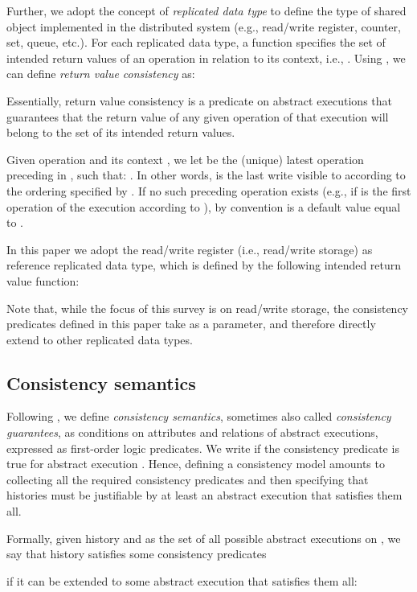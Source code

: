 \documentclass[letter, 11pt]{article}
\newcommand{\citeN}{\citet}
\renewcommand{\cite}{\citep}
\begin{document}
Further, we adopt the concept of \emph{replicated data type} \cite{Burckhardt:14}
to define the type of shared object implemented in the distributed system
(e.g., read/write register, counter, set, queue, etc.).
For each replicated data type, a function  specifies 
the set of intended return values of an operation  in relation to 
its context, i.e.,  .
Using , we can define \emph{return value consistency} as:

Essentially, return value consistency is a predicate on abstract executions that guarantees 
that the return value of any given operation of that execution will belong to the set of its intended return values.

Given operation  and its context , 
we let  be the (unique) latest operation preceding 
in , such that: . In other words,  is the last write visible to  according to the ordering specified by . 
If no such preceding operation exists (e.g., if  is the first operation of the execution according to ), 
by convention  is a default value equal to .

In this paper we adopt the read/write register (i.e., read/write storage) as reference replicated data type, 
which is defined by the following intended return value function:




Note that, while the focus of this survey is on read/write storage, the consistency predicates defined in this paper take  as a parameter, and therefore directly extend to other replicated data types. 

\subsection{Consistency semantics}

Following \citeN{Burckhardt:14}, we define \emph{consistency semantics},  
sometimes also called \emph{consistency guarantees},  as conditions on attributes
and relations of abstract executions, expressed as first-order logic predicates.
We write  if the consistency predicate  is true for abstract execution . 
Hence, defining a consistency model amounts to collecting all the required consistency predicates 
and then specifying that histories must be justifiable by at least an abstract execution 
that satisfies them all.

Formally, given history  and  as the set of all possible abstract executions on ,
we say that history  satisfies some consistency predicates 

if it can be extended to some abstract execution that satisfies them all:
\end{document}
